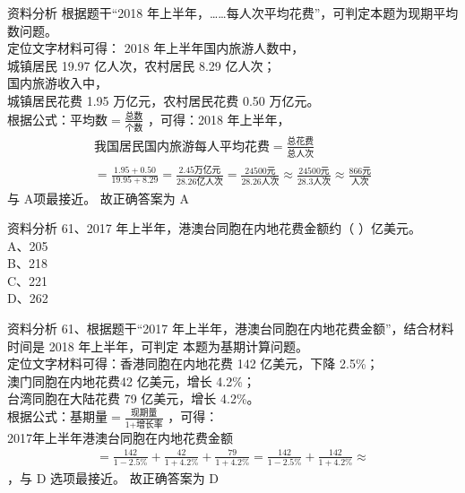 \documentclass[aspectratio=169]{beamer}
\begin{document}
\begin{frame}[t]{资料分析}
    根据题干“2018 年上半年，……每人次平均花费”，可判定本题为现期平均数问题。\\
    定位文字材料可得：
    2018 年上半年国内旅游人数中，\\
    城镇居民 19.97 亿人次，农村居民 8.29 亿人次；\\
    国内旅游收入中，\\
    城镇居民花费 1.95 万亿元，农村居民花费 0.50 万亿元。\\
    根据公式：$\text{平均数} = \frac{\text{总数}}{\text{个数}}$ ，可得：2018 年上半年，
    {\small
    \begin{gather}
        \text{我国居民国内旅游每人平均花费}   =  \frac{\text{总花费}}{\text{总人次}}\\
        =  \frac{1.95+0.50}{19.95 +8.29}
        =  \frac{2.45\text{万亿元}}{28.26\text{亿人次}}
        =  \frac{24500\text{元}}{28.26\text{人次}}
        \approx  \frac{24500\text{元}}{28.3\text{人次}}
        \approx  \frac{866\text{元}}{\text{人次}}
    \end{gather}
    }
    与 A项最接近。
    故正确答案为 A\\
\end{frame}                           





\begin{frame}[t]{资料分析}
    61、2017 年上半年，港澳台同胞在内地花费金额约（ ）亿美元。\\
    A、205                                                    \\
    B、218                                                    \\
    C、221                                                    \\
    D、262                                                    \\
\end{frame}                           

\begin{frame}[t]{资料分析}
    61、根据题干“2017 年上半年，港澳台同胞在内地花费金额”，结合材料时间是 2018 年上半年，可判定
    本题为基期计算问题。\\
    定位文字材料可得：香港同胞在内地花费 142 亿美元，下降 2.5\%；\\
    澳门同胞在内地花费42 亿美元，增长 4.2\%；\\
    台湾同胞在大陆花费 79 亿美元，增长 4.2\%。\\
    根据公式：$\text{基期量} = \frac{\text{现期量}}{\text{1+增长率}}$ ，可得：\\
    2017年上半年港澳台同胞在内地花费金额
    \begin{gather}
        = \frac{142}{1-2.5\%} + \frac{42}{1+4.2\%} + \frac{79}{1+4.2\%} 
        = \frac{142}{1-2.5\%} + \frac{142}{1+4.2\%} 
        \approx 
    \end{gather}
    ，与 D 选项最接近。
    故正确答案为 D
\end{frame}                           
\end{document}
